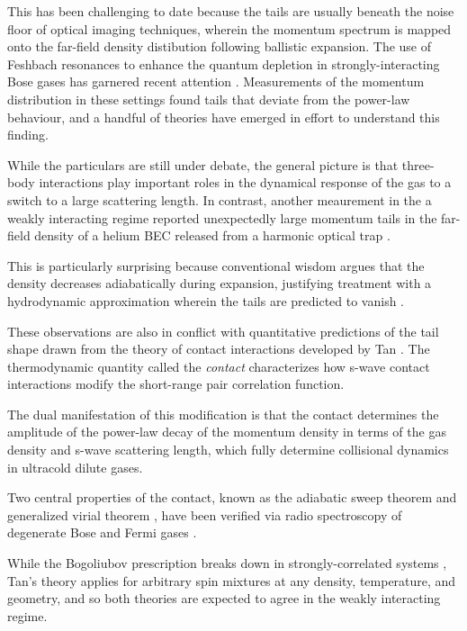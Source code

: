 	This has been challenging to date because the tails are usually beneath the noise floor of optical imaging techniques, wherein the momentum spectrum is mapped onto the far-field density distibution following ballistic expansion.
	The use of Feshbach resonances to enhance the quantum depletion in strongly-interacting Bose gases has garnered recent attention \cite{Makotyn14,Fletcher17,Eigen18}.
	Measurements of the momentum distribution in these settings \cite{Makotyn14,Eigen18} found tails that deviate from the power-law behaviour, and a handful of theories have emerged \cite{Kira15_coherent,Colussi20,Smith14} in effort to understand this finding.
	
	While the particulars are still under debate, the general picture is that three-body interactions play important roles in the dynamical response of the gas to a switch to a large scattering length.
	In contrast, another meaurement in the a weakly interacting regime reported unexpectedly large momentum tails in the far-field density of a helium BEC released from a harmonic optical trap \cite{Chang16}.
	
	This is particularly surprising because conventional wisdom argues that the density decreases adiabatically during expansion, justifying treatment with a hydrodynamic approximation wherein the tails are predicted to vanish \cite{Qu16}.
	

	These observations are also in conflict with quantitative predictions of the tail shape drawn from the theory of contact interactions developed by Tan \cite{Tan08_energetics,Tan08_momentum,Tan08_virial}.
	The thermodynamic quantity called the \emph{contact} characterizes how s-wave contact interactions modify the short-range pair correlation function.
	
	The dual manifestation of this modification is that the contact determines the amplitude of the power-law decay of the momentum density in terms of the gas density and s-wave scattering length, which fully determine collisional dynamics in ultracold dilute gases.
	
	Two central properties of the contact, known as the adiabatic sweep theorem and generalized virial theorem \cite{Tan08_momentum,Tan08_virial}, have been verified via radio spectroscopy \cite{Baym07,Punk07,Braaten10} of degenerate Bose \cite{Wild12} and Fermi gases \cite{Stewart10,Sagi12}.
	
	While the Bogoliubov prescription breaks down in strongly-correlated systems \cite{Lopes17_quasiparticle}, Tan’s theory applies for arbitrary spin mixtures at any density, temperature, and geometry, and so both theories are expected to agree in the weakly interacting regime.

